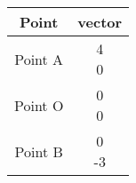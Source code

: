 \begin{tabular}[12pt]{ |c| c|}
    \hline
    \textbf{Point}& \textbf{vector} \\ 
    \hline
	 Point A  & \myvec{4\\0}\\
    \hline 
	 Point O & \myvec{0\\0} \\
    \hline
	  Point B & \myvec{0\\-3}\\
    \hline
    \end{tabular}